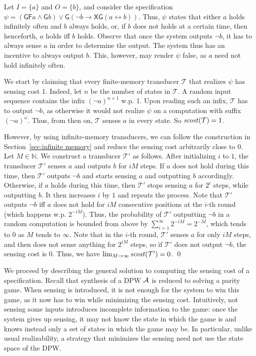 \documentclass[runningheads,a4paper]{llncs}
\renewenvironment{example}{\begin{xmpl}\rm}{\end{xmpl}}
\newcommand{\set}[1]{{\{#1\}}}
\newcommand{\Nat}{\mathbb{N}}
\newcommand{\Next}{\mathsf{X}}
\newcommand{\Ev}{\mathsf{F}}
\newcommand{\Alw}{\mathsf{G}}
\newcommand{\T}{{\mathcal T}}
\newcommand{\DPW}{\mbox{\rm DPW}\xspace}
\newcommand{\A}{{\cal A}}
\newcommand{\scost}{{\it scost}}
\begin{document}
\begin{example}
Let $I=\set{a}$ and $O=\set{b}$, and consider the specification $\psi=(\Alw \Ev a\wedge \Alw b)\vee \Alw(\neg b\to \Next\Alw(a\leftrightarrow b))$. Thus, $\psi$ states that either $a$ holds infinitely often and $b$ always holds, or, if $b$ does not holds at a certain time, then henceforth, $a$ holds iff $b$ holds. Observe that once the system outputs $\neg b$, it has to always sense $a$ in order to determine the output. 
The system thus has an incentive to always output $b$. This, however, may render $\psi$ false, as $a$ need not hold infinitely often.

We start by claiming that every finite-memory transducer $\T$ that realizes $\psi$ has sensing cost 1. Indeed, let $n$ be the number of states in $\T$. A random input sequence contains the infix $(\neg a)^{n+1}$ w.p. 1. Upon reading such an infix, $\T$ has to output $\neg b$, as otherwise it would not realize $\psi$ on a computation with suffix $(\neg a)^\omega$. Thus, from then on, $\T$ 
senses
$a$ in every state. So $\scost(\T)=1$.

However, by using infinite-memory transducers, we can follow the construction in Section~\ref{sec:infinite memory} and reduce the sensing cost arbitrarily close to $0$. Let $M\in \Nat$. We construct a transducer $\T'$ as follows. After initializing $i$ to $1$, the transducer $\T'$ senses $a$ and outputs $b$ for $iM$ steps. If $a$ does not hold during this time, then $\T'$ outputs $\neg b$ and starts sensing $a$ and outputting $b$ accordingly. Otherwise, if $a$ holds during this time, then $\T'$ stops sensing $a$ for ${2^{i}}$ steps, while outputting $b$. It then increases $i$ by $1$ and repeats the process. 
Note that $\T'$ outputs $\neg b$ iff $a$ does not hold for $iM$ consecutive positions at the $i$-th round (which happens w.p. $2^{-iM}$). Thus, the probability of $\T'$ outputting $\neg b$ in a random computation is bounded from above by $\sum_{i=1}^\infty 2^{-iM}=2^{-M}$, which tends to $0$ as $M$ tends to $\infty$. Note that in the $i$-th round, $\T'$ senses $a$ for only $iM$ steps, and then does not sense anything for $2^{iM}$ steps, so if $\T'$ does not output $\neg b$, the sensing cost is $0$. Thus, we have 
$\lim_{M\to \infty}\scost(\T')=0$. \qed






\end{example}

We proceed by describing the general solution to computing the sensing cost of a specification.
Recall that synthesis of a DPW $\A$ is reduced to solving a parity game.
When sensing is introduced, it is not enough for the system to win this game, as it now has to win while minimizing the sensing cost. Intuitively, not sensing some inputs introduces incomplete information to the game: once the system gives up sensing, it may not know the state in which the game is and knows instead only a set of states in which the game may be. In particular, unlike usual realizability, a strategy that minimizes the sensing need not use the state space of the \DPW. 
\end{document}
